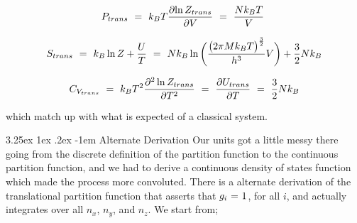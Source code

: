 \documentclass{article}
\makeatletter
\renewcommand\subparagraph{\@startsection{subparagraph}{6}{\parindent}%
  {3.25ex \@plus1ex \@minus .2ex}%
  {-1em}%
  {\normalfont\normalsize\bfseries}}
\makeatother
\begin{document}
\begin{equation} \label{eb-eq-256-97}
P_{trans} \hspace{0.125cm} = \hspace{0.125cm} k_B T \frac{\partial{\ln{Z_{trans}}}}{\partial{V}} \hspace{0.125cm} = \hspace{0.125cm} \frac{N k_B T}{V} \hspace{0.125cm}
\end{equation}

\begin{equation} \label{eb-eq-256-98}
S_{trans} \hspace{0.125cm} = \hspace{0.125cm} k_B \ln{Z} + \frac{U}{T} \hspace{0.125cm} = \hspace{0.125cm} N k_B \ln \bigg( \frac{\big( 2 \pi M k_B T \big)^{\frac{3}{2}}}{h^3} V \bigg)  + \frac{3}{2} N k_B
\end{equation}

\begin{equation} \label{eb-eq-256-99}
C_{V_{trans}} \hspace{0.125cm} = \hspace{0.125cm} k_B T^2 \frac{\partial^2 \ln{Z_{trans}}}{\partial{T}^2} \hspace{0.125cm} = \hspace{0.125cm} \frac{\partial{U_{trans}}}{\partial{T}} \hspace{0.125cm} = \hspace{0.125cm} \frac{3}{2} N k_B 
\end{equation}

which match up with what is expected of a classical system.

\subparagraph{Alternate Derivation}
Our units got a little messy there going from the discrete definition of the partition function to the continuous partition function, and we had to derive a continuous density of states function which made the process more convoluted. There is a alternate derivation of the translational partition function that asserts that \begin{math} g_i \hspace{0.025cm} = \hspace{0.025cm} 1 \end{math}, for all \begin{math} i \end{math}, and actually integrates over all \begin{math} n_x \end{math}, \begin{math} n_y \end{math}, and \begin{math} n_z \end{math}. We start from;
\end{document}
